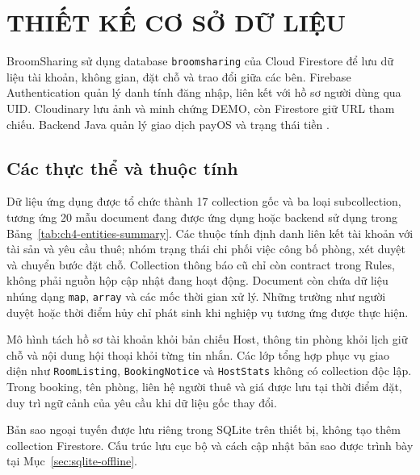 \chapstart
\section{THIẾT KẾ CƠ SỞ DỮ LIỆU}
\label{sec:database-design}
\begingroup
{}
\setlength{\emergencystretch}{1em}

BroomSharing sử dụng database \texttt{broomsharing} của Cloud Firestore để lưu dữ liệu tài khoản, không gian, đặt chỗ và trao đổi giữa các bên. Firebase Authentication quản lý danh tính đăng nhập, liên kết với hồ sơ người dùng qua UID. Cloudinary lưu ảnh và minh chứng DEMO, còn Firestore giữ URL tham chiếu. Backend Java quản lý giao dịch payOS và trạng thái tiền \parencite{broomsharing_source}.

\subsection{Các thực thể và thuộc tính}
\label{sec:ch4-entities}

Dữ liệu ứng dụng được tổ chức thành 17 collection gốc và ba loại subcollection, tương ứng 20 mẫu document đang được ứng dụng hoặc backend sử dụng trong Bảng~\ref{tab:ch4-entities-summary}. Các thuộc tính định danh liên kết tài khoản với tài sản và yêu cầu thuê; nhóm trạng thái chi phối việc công bố phòng, xét duyệt và chuyển bước đặt chỗ. Collection thông báo cũ chỉ còn contract trong Rules, không phải nguồn hộp cập nhật đang hoạt động. Document còn chứa dữ liệu nhúng dạng \texttt{map}, \texttt{array} và các mốc thời gian xử lý. Những trường như người duyệt hoặc thời điểm hủy chỉ phát sinh khi nghiệp vụ tương ứng được thực hiện.



Mô hình tách hồ sơ tài khoản khỏi bản chiếu Host, thông tin phòng khỏi lịch giữ chỗ và nội dung hội thoại khỏi từng tin nhắn. Các lớp tổng hợp phục vụ giao diện như \texttt{Room\allowbreak{}Listing}, \texttt{Booking\allowbreak{}Notice} và \texttt{Host\allowbreak{}Stats} không có collection độc lập. Trong booking, tên phòng, liên hệ người thuê và giá được lưu tại thời điểm đặt, duy trì ngữ cảnh của yêu cầu khi dữ liệu gốc thay đổi.

Bản sao ngoại tuyến được lưu riêng trong SQLite trên thiết bị, không tạo thêm collection Firestore. Cấu trúc lưu cục bộ và cách cập nhật bản sao được trình bày tại Mục~\ref{sec:sqlite-offline}.

